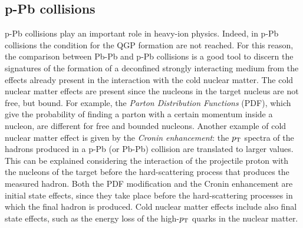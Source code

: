 \subsection{p-Pb collisions}
p-Pb collisions play an important role in heavy-ion physics. Indeed, in p-Pb collisions the condition for the QGP formation are not reached. For this reason, the comparison between Pb-Pb and p-Pb collisions is a good tool to discern the signatures of the formation of a deconfined strongly interacting medium from the effects already present in the interaction with the cold nuclear matter. The cold nuclear matter effects are present since the nucleons in the target nucleus are not free, but bound. For example, the \textit{Parton Distribution Functions} (PDF), which give the probability of finding a parton with a certain momentum inside a nucleon, are different for free and bounded nucleons. Another example of cold nuclear matter effect is given by the \textit{Cronin enhancement}: the $p_\text{T}$ spectra of the hadrons produced in a p-Pb (or Pb-Pb) collision are translated to larger values. This can be explained considering the interaction of the projectile proton with the nucleons of the target before the hard-scattering process that produces the measured hadron. Both the PDF modification and the Cronin enhancement are initial state effects, since they take place before the hard-scattering processes in which the final hadron is produced. Cold nuclear matter effects include also final state effects, such as the energy loss of the high-$p_\text{T}$ quarks in the nuclear matter.
